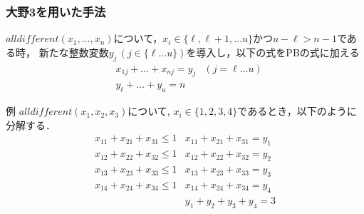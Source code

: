 \begin{frame}
    \frametitle{大野3を用いた手法}
    \begin{block}{}
        $alldifferent(x_1,\dots,x_n)$について，$x_i \in \{\ell,\ell+1,\dots u\}$かつ$u-\ell > n-1$である時，
        新たな整数変数$y_j \, (j \in \{\ell \dots u\})$を導入し，以下の式をPBの式に加える
        \vspace{-3mm}
        \begin{eqnarray*}
            & x_{1j} + \dots + x_{nj}  =  y_j & (j=\ell \dots u)\\
            & y_{\ell} + \dots + y_u  =  n    &
        \end{eqnarray*}
    \end{block}
    \begin{exampleblock}{例}
        $alldifferent(x_1, x_2, x_3)$について, $x_i \in \{1,2,3,4\}$であるとき，以下のように分解する．
        \vspace{-3mm}
        \begin{eqnarray*}
            x_{11} + x_{21} + x_{31} \leq 1 & x_{11} + x_{21} + x_{31} = y_1 \\
            x_{12} + x_{22} + x_{32} \leq 1 & x_{12} + x_{22} + x_{32} = y_2 \\
            x_{13} + x_{23} + x_{33} \leq 1 & x_{13} + x_{23} + x_{33} = y_3 \\
            x_{14} + x_{24} + x_{34} \leq 1 & x_{14} + x_{24} + x_{34} = y_4 \\
                                            & y_1 + y_2 + y_3 + y_4 = 3
        \end{eqnarray*}
    \end{exampleblock}
\end{frame}



